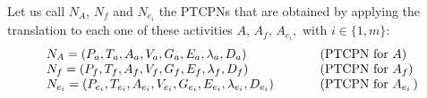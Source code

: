 
Let us call $N_A$, $N_{f}$ and $N_{e_i}$ the PTCPNs that
are obtained by applying the translation to each one of these
activities $A$, $A_f$, $A_{e_{i}},$ with $i\in\{1,m\}$:
%
\[
\begin{array}{lll}
N_A = (P_a, T_a, A_a, V_a, G_a, E_a, \lambda_a, D_a) &
\hspace*{0.6cm} & {\rm
(PTCPN~for~}A)\\
N_f = (P_f, T_f, A_f, V_f, G_f, E_f, \lambda_f, D_f)  &
\ & {\rm (PTCPN~for~}A_f)\\
N_{e_i} = (P_{e_i}, T_{e_i}, A_{e_i}, V_{e_i}, G_{e_i}, 
E_{e_i}, \lambda_{e_i}, D_{e_i})  &
\ & {\rm (PTCPN~for~}A_{e_i}\,)
\end{array}
\]

